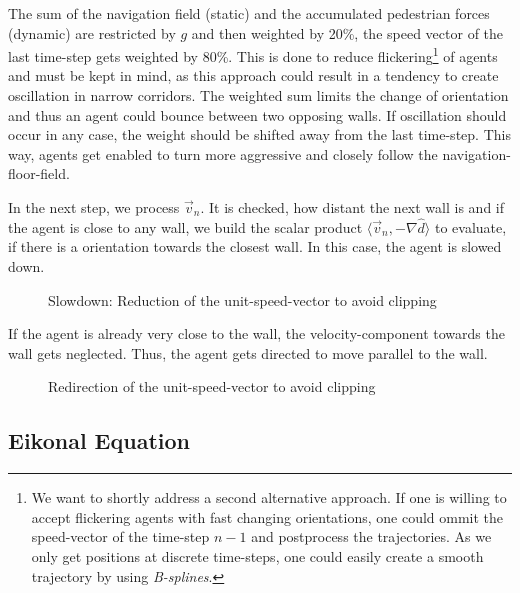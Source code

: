 The sum of the navigation field (static) and the accumulated pedestrian forces (dynamic) are restricted by $g$ and then weighted by 20\%, the speed vector of the last time-step gets weighted by 80\%. This is done to reduce flickering\footnote{We want to shortly address a second alternative approach. If one is willing to accept flickering agents with fast changing orientations, one could ommit the speed-vector of the time-step $n-1$ and postprocess the trajectories. As we only get positions at discrete time-steps, one could easily create a smooth trajectory by using \emph{B-splines}.} of agents and must be kept in mind, as this approach could result in a tendency to create oscillation in narrow corridors. The weighted sum limits the change of orientation and thus an agent could bounce between two opposing walls.  If oscillation should occur in any case, the weight should be shifted away from the last time-step. This way, agents get enabled to turn more aggressive and closely follow the navigation-floor-field.

In the next step, we process $\vec{v}_{n}$. It is checked, how distant the next wall is and if the agent is close to any wall, we build the scalar product $\langle\vec{v}_{n},-\nabla \hat{d}\rangle$ to evaluate, if there is a orientation towards the closest wall. In this case, the agent is slowed down.
%
\begin{figure}[h!]
\begin{center}

\caption{Slowdown: Reduction of the unit-speed-vector to avoid clipping}
\label{slowdownfig}
\end{center}
\end{figure}
If the agent is already very close to the wall, the velocity-component towards the wall gets neglected. Thus, the agent gets directed to move parallel to the wall.
%
\begin{figure}[h!]
\begin{center}

\caption{Redirection of the unit-speed-vector to avoid clipping}
\label{redirectfig}
\end{center}
\end{figure}

\subsection{Eikonal Equation}\label{eikonalequation}

